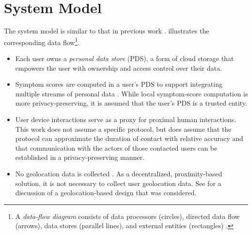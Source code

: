 \section{System Model}\label{sec:system-model}


The system model is similar to that in previous work \citep{Ayday2020, Ayday2021}.  illustrates the corresponding data flow\footnote{A \emph{data-flow diagram} consists of data processors (circles), directed data flow (arrows), data stores (parallel lines), and external entities (rectangles) \cite[pp. 437--438]{Fowler2004}\label{foot:dataflow}.}.
\begin{itemize}
  \item Each user owns a \emph{personal data store} (PDS), a form of cloud storage that empowers the user with ownership and access control over their data.
  \item Symptom scores are computed in a user's PDS to support integrating multiple streams of personal data \citep{Ayday2020}. While local symptom-score computation \citep{Ayday2020, Ayday2021} is more privacy-preserving, it is assumed that the user's PDS is a trusted entity.
  \item User device interactions serve as a proxy for proximal human interactions. This work does not assume a specific protocol, but does assume that the protocol can approximate the duration of contact with relative accuracy and that communication with the actors of those contacted users can be established in a privacy-preserving manner.
  \item No geolocation data is collected \citep{Ayday2020}. As a decentralized, proximity-based solution, it is not necessary to collect user geolocation data. See  for a discussion of a geolocation-based design that was considered.
\end{itemize}

%
